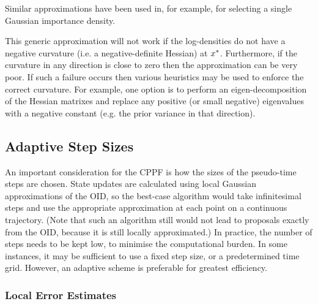 \documentclass{article}
\begin{document}
Similar approximations have been used in, for example, \citep{Doucet2000a,Pitt1999} for selecting a single Gaussian importance density.

This generic approximation will not work if the log-densities do not have a negative curvature (i.e. a negative-definite Hessian) at $x_{}^*$. Furthermore, if the curvature in any direction is close to zero then the approximation can be very poor. If such a failure occurs then various heuristics may be used to enforce the correct curvature. For example, one option is to perform an eigen-decomposition of the Hessian matrixes and replace any positive (or small negative) eigenvalues with a negative constant (e.g. the prior variance in that direction).
%



\subsection{Adaptive Step Sizes}

An important consideration for the CPPF is how the sizes of the pseudo-time steps are chosen. State updates are calculated using local Gaussian approximations of the OID, so the best-case algorithm would take infinitesimal steps and use the appropriate approximation at each point on a continuous trajectory. (Note that such an algorithm still would not lead to proposals exactly from the OID, because it is still locally approximated.) In practice, the number of steps needs to be kept low, to minimise the computational burden. In some instances, it may be sufficient to use a fixed step size, or a predetermined time grid. However, an adaptive scheme is preferable for greatest efficiency.

\subsubsection{Local Error Estimates}
\end{document}
